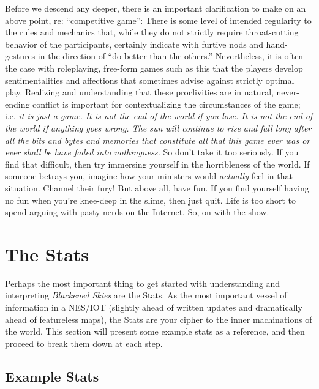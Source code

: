 \documentclass[11 pt]{scrartcl}
\begin{document}
Before we descend any deeper, there is an important clarification to make on an above point, re: ``competitive game'': There is some level of intended regularity to the rules and mechanics that, while they do not strictly require throat-cutting behavior of the participants, certainly indicate with furtive nods and hand-gestures in the direction of ``do better than the others.'' Nevertheless, it is often the case with roleplaying, free-form games such as this that the players develop sentimentalities and affections that sometimes advise against strictly optimal play. Realizing and understanding that these proclivities are in natural, never-ending conflict is important for contextualizing the circumstances of the game; i.e. \textit{it is just a game. It is not the end of the world if you lose. It is not the end of the world if anything goes wrong. The sun will continue to rise and fall long after all the bits and bytes and memories that constitute all that this game ever was or ever shall be have faded into nothingness.} So don't take it too seriously. If you find that difficult, then try immersing yourself in the horribleness of the world. If someone betrays you, imagine how your ministers would \textsl{actually} feel in that situation. Channel their fury! But above all, have fun. If you find yourself having no fun when you're knee-deep in the slime, then just quit. Life is too short to spend arguing with pasty nerds on the Internet. So, on with the show.\\

\section{The Stats}

Perhaps the most important thing to get started with understanding and interpreting \textsl{Blackened Skies} are the Stats. As the most important vessel of information in a NES/IOT (slightly ahead of written updates and dramatically ahead of featureless maps), the Stats are your cipher to the inner machinations of the world. This section will present some example stats as a reference, and then proceed to break them down at each step.

\pagebreak

\subsection*{Example Stats}
\end{document}
